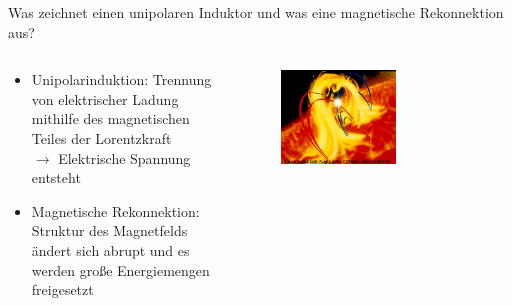   \begin{frame}{Was zeichnet einen unipolaren Induktor und was eine magnetische Rekonnektion aus?}
    \begin{columns}
   \begin{column}{0.5\textwidth}
    \begin{itemize}
      \setlength\itemsep{2em}
      \item  Unipolarinduktion: Trennung von elektrischer Ladung mithilfe des magnetischen Teiles der Lorentzkraft\\[1.5em]
            $\longrightarrow$ Elektrische Spannung entsteht
      \item  Magnetische Rekonnektion: Struktur des Magnetfelds ändert sich abrupt und es werden große Energiemengen freigesetzt
    \end{itemize}
  \vspace{2em}
  \end{column}
  \begin{column}{0.5\textwidth}
  \begin{figure}
    \centering
    \includegraphics[width=0.6\textwidth]{images/rekonnektion.png}
  \end{figure}
  \end{column}
    \end{columns}
  \end{frame}


